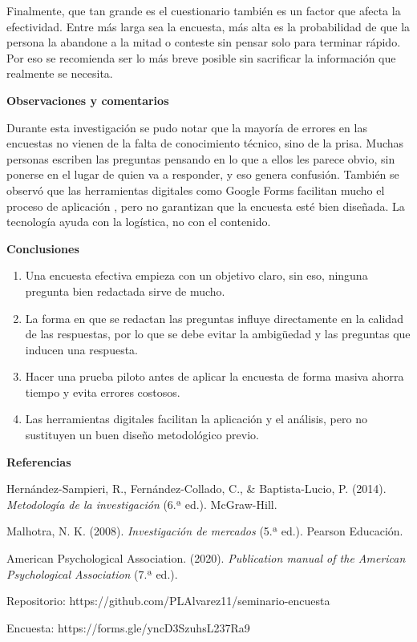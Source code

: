 \documentclass[12pt,letterpaper]{article}
\begin{document}
Finalmente, que tan grande es el cuestionario también es un factor que afecta la efectividad. Entre más larga sea la encuesta, más alta es la probabilidad de que la persona la abandone a la mitad o conteste sin pensar solo para terminar rápido. Por eso se recomienda ser lo más breve posible sin sacrificar la información que realmente se necesita.

\textbf{Observaciones y comentarios}

Durante esta investigación se pudo notar que la mayoría de errores en las encuestas no vienen de la falta de conocimiento técnico, sino de la prisa. Muchas personas escriben las preguntas pensando en lo que a ellos les parece obvio, sin ponerse en el lugar de quien va a responder, y eso genera confusión. También se observó que las herramientas digitales como Google Forms facilitan mucho el proceso de aplicación , pero no garantizan que la encuesta esté bien diseñada. La tecnología ayuda con la logística, no con el contenido. 

\textbf{Conclusiones}

\begin{enumerate}[label=\arabic*.]
\item Una encuesta efectiva empieza con un objetivo claro, sin eso, ninguna pregunta bien redactada sirve de mucho.
\item La forma en que se redactan las preguntas influye directamente en la calidad de las respuestas, por lo que se debe evitar la ambigüedad y las preguntas que inducen una respuesta.
\item Hacer una prueba piloto antes de aplicar la encuesta de forma masiva ahorra tiempo y evita errores costosos.
\item Las herramientas digitales facilitan la aplicación y el análisis, pero no sustituyen un buen diseño metodológico previo.
\end{enumerate}

\textbf{Referencias}

Hernández-Sampieri, R., Fernández-Collado, C., \& Baptista-Lucio, P. (2014). \textit{Metodología de la investigación} (6.ª ed.). McGraw-Hill.

Malhotra, N. K. (2008). \textit{Investigación de mercados} (5.ª ed.). Pearson Educación.

American Psychological Association. (2020). \textit{Publication manual of the American Psychological Association} (7.ª ed.).

\vspace{0.5cm}
\noindent \small Repositorio: https://github.com/PLAlvarez11/seminario-encuesta

\noindent \small Encuesta: https://forms.gle/yncD3SzuhsL237Ra9
\end{document}
